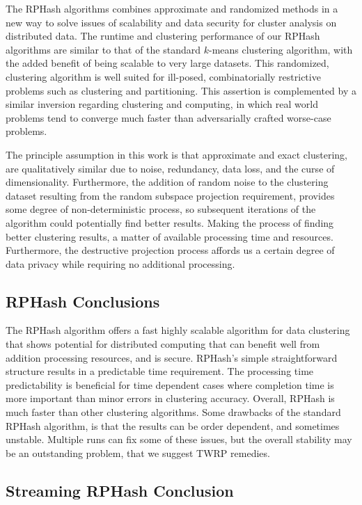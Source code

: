 The \textsf{RPHash} algorithms combines approximate and randomized methods in a new way to solve
issues of scalability and data security for cluster analysis on distributed data.  The runtime and
clustering performance of our \textsf{RPHash} algorithms are similar to that of the standard $k$-means
clustering algorithm, with the added benefit of being scalable to very large datasets.  This
randomized, clustering algorithm is well suited for ill-posed, combinatorially restrictive problems
such as clustering and partitioning.  This assertion is complemented by a similar inversion
regarding clustering and computing, in which real world problems tend to converge much faster than
adversarially crafted worse-case problems.

The principle assumption in this work is that approximate and exact clustering, are qualitatively
similar due to noise, redundancy, data loss, and the curse of dimensionality.  Furthermore, the
addition of random noise to the clustering dataset resulting from the random subspace projection
requirement, provides some degree of non-deterministic process, so subsequent iterations of the
algorithm could potentially find better results.  Making the process of finding better clustering
results, a matter of available processing time and resources.  Furthermore, the destructive
projection process affords us a certain degree of data privacy while requiring no additional
processing.

\subsection{RPHash Conclusions}

The \textsf{RPHash} algorithm offers a fast highly scalable algorithm for data clustering that shows
potential for distributed computing that can benefit well from addition processing resources, and is
secure.  \textsf{RPHash}'s simple straightforward structure results in a predictable time requirement.  The
processing time predictability is beneficial for time dependent cases where completion time is more
important than minor errors in clustering accuracy.  Overall, \textsf{RPHash} is much faster than other
clustering algorithms.  Some drawbacks of the standard \textsf{RPHash} algorithm, is that the results can be
order dependent, and sometimes unstable.  Multiple runs can fix some of these issues, but the
overall stability may be an outstanding problem, that we suggest \textsf{TWRP} remedies.

\subsection{Streaming RPHash Conclusion}

